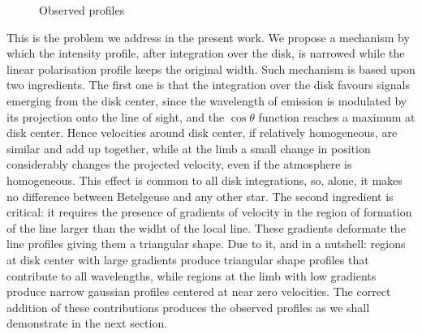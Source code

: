 \documentclass{/Users/art2/TeX/aanda/aa}
\def\kms {km\,s$^{-1}$}
\begin{document}
\begin{figure}
   \caption{Observed profiles }
   \label{obsprofiles}
   \end{figure}

This is the problem we address in the present work. We propose a mechanism by which the intensity profile, after integration over the disk, is narrowed 
while the linear polarisation profile keeps the original width. Such mechanism is based upon two ingredients. The first one is  that the integration 
over the disk favours signals emerging from the disk center, since the wavelength of emission is modulated by its projection onto the line of sight, and the
$\cos \theta$ function reaches a maximum at disk center. Hence velocities around  disk center, if relatively homogeneous, are similar and add up together, while at 
the limb a small change in position considerably changes the projected velocity, even if the atmosphere is homogeneous. This effect is common to all disk integrations, so, alone, 
it makes no difference between Betelgeuse and any other star. The second ingredient is critical: it requires the presence of gradients of velocity 
in the region of formation of the line larger than the widht of the local line. These gradients deformate the line profiles giving them a triangular 
shape. Due to it, and in a nutshell: regions at disk center with large gradients produce  triangular shape profiles that contribute to all wavelengths, while 
regions at the limb with low gradients produce narrow gaussian profiles centered at near zero velocities. The correct addition of these contributions 
produces the observed profiles as we shall demonstrate in the next section. 
\end{document}
